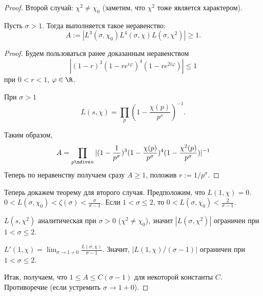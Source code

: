 \begin{proof}
  Второй случай: $\chi^2 \ne \chi_0$ (заметим, что $\chi^2$ тоже является характером).
  
  \begin{lemma}
    Пусть $\sigma > 1$. Тогда выполняется такое неравенство:
    $$
      A := |L^3(\sigma, \chi_0)L^4(\sigma, \chi)L(\sigma, \chi^2)| \geq 1.
    $$
  \end{lemma}
  \begin{proof}
    Будем пользоваться ранее доказанным неравенством
    $$
      |(1-r)^3(1-r e^{i \varphi})^4 (1 - r e^{2i \varphi})| \leq 1
    $$
    при $0 < r < 1$, $\varphi \in \R$.
    
    При $\sigma > 1$
    $$
      L(s, \chi) = \prod_p \left( 1 - \frac{\chi(p)}{p^s}\right)^{-1}.
    $$
    
    Таким образом,
    $$
    A = \prod_{p \ndivs n} |(1 - \frac{1}{p^{\sigma}})^3(1 - \frac{\chi(p)}{p^{\sigma}})^4 (1 - \frac{\chi^2(p)}{p^{\sigma}})|^{-1}
    $$
    Теперь по неравенству получаем сразу $A \geq 1$, положив $r := 1 / p^{\sigma}$.
  \end{proof}
  
  Теперь докажем теорему для второго случая. Предположим, что $L(1, \chi) = 0$. $0 < L(\sigma, \chi_0) < \zeta(\sigma) < \frac{\sigma}{\sigma - 1}$. Если $1 < \sigma \leq 2$, то $0 < L(\sigma, \chi_0) < \frac{2}{\sigma - 1}$.
  
  $L(s, \chi^2)$ аналитическая при $\sigma > 0$ ($\chi^2 \ne \chi_0$), значит $|L(\sigma, \chi^2)|$ ограничен при $1 < \sigma \leq 2$.
  
  $L'(1, \chi) = \lim_{\sigma \to 1 + 0} \frac{L(\sigma, \chi)}{\sigma - 1}$. Значит, $|L(1, \chi) / (\sigma - 1)|$ ограничен при $1 < \sigma \leq 2$.
  
  Итак, получаем, что $1 \leq A \leq C(\sigma - 1)$ для некоторой константы $C$. Противоречие (если устремить $\sigma \to 1 + 0$).
\end{proof}

